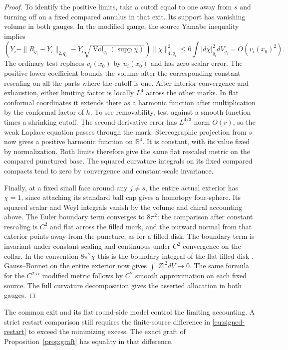\begin{proof}
To identify the positive limits, take a cutoff equal to one
away from \(s\) and turning off on a fixed compared annulus in
that exit. Its support has vanishing volume in both gauges.
In the modified gauge, the source Yamabe inequality implies
\[
 \left(Y_i-\|R_{q_i}-Y_i\|_{2,q_i}
  -Y_i\sqrt{\operatorname{Vol}_{q_i}(\operatorname{supp}\chi)}\right)
 \|\chi\|_{4,q_i}^2
 \le6\int|d\chi|_{q_i}^2dV_{q_i}=O(v_i(x_0)^2).
\]
The ordinary test replaces \(v_i(x_0)\) by \(u_i(x_0)\)
and has zero scalar error. The positive lower coefficient
bounds the volume after the corresponding constant rescaling
on all the parts where the cutoff is one. After interior
convergence and exhaustion, either limiting factor is locally
\(L^4\) across the other marks. In flat conformal coordinates
it extends there as a harmonic function after multiplication
by the conformal factor of \(h\). To see removability, test
against a smooth function times a shrinking cutoff. The
second-derivative error has \(L^{4/3}\) norm \(O(r)\), so the
weak Laplace equation passes through the mark. Stereographic
projection from \(s\) now gives a positive harmonic function
on \(\mathbb R^4\). It is constant, with its value fixed by
normalization. Both limits therefore give the same flat
rescaled metric on the compared punctured base. The squared
curvature integrals on its fixed compared compacts tend to zero
by convergence and constant-scale invariance.

Finally, at a fixed small face around any \(j\ne s\), the
entire actual exterior has \(\chi=1\), since attaching its
standard ball cap gives a homotopy four-sphere. Its squared
scalar and Weyl integrals vanish by the volume and chiral
accounting above. The Euler boundary term converges to
\(8\pi^2\): the comparison after constant rescaling is \(C^2\)
and flat across the filled mark, and the outward normal from
that exterior points away from the puncture, as for a filled
disk. The boundary term is invariant under constant scaling
and continuous under \(C^2\) convergence on the collar.
In the convention \(8\pi^2\chi\) this is the boundary
integral of the flat filled disk
\cite[Section 7, (7.4)]{TianViaclovsky2005ALE}.
Gauss--Bonnet on the entire exterior now gives
\(\int|Z|^2dV\to0\). The same formula for the
\(C^{2,\alpha}\) modified metric follows by \(C^2\) smooth
approximation on each fixed source. The full curvature
decomposition gives the asserted allocation in both gauges.
\end{proof}

The common exit and its flat round-side model control the limiting
accounting. A strict restart comparison still requires the
finite-source difference in \eqref{eq:signed-restart} to exceed
the minimizing excess. The exact graft of
Proposition~\ref{prop:graft} has equality in that difference.
